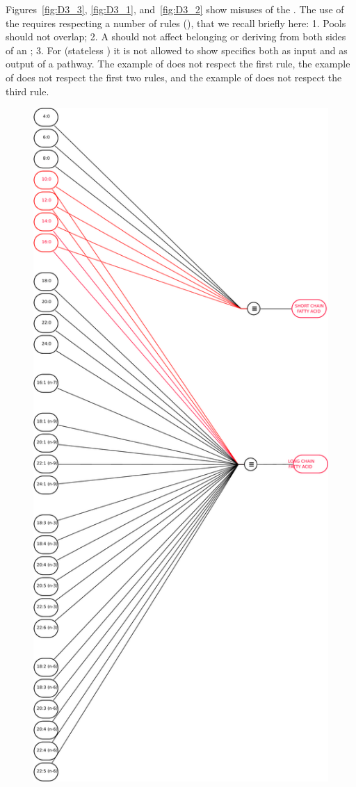 Figures~\ref{fig:D3_3}, \ref{fig:D3_1}, and~\ref{fig:D3_2} show misuses of the .
The use of the  requires respecting a number of rules (), that we recall briefly here: 1. Pools should not overlap; 2. A  should not affect  belonging or deriving from both sides of an ; 3. For  (stateless ) it is not allowed to show specifics both as input and as output of a pathway.
The example of  does not respect the first rule, the example of  does not respect the first two rules, and the example of  does not respect the third rule.

\begin{figure}
\begin{center}
\includegraphics[scale=0.4]{images/build/d3_3_example.pdf}

\end{center}
\end{figure}
